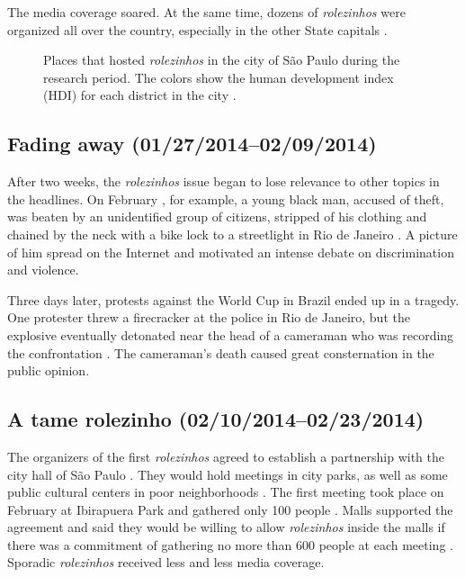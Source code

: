 The media coverage soared. At the same time, dozens of \emph{rolezinhos} were organized all over the country, especially in the other State capitals \autocite{atarde_rolezinho_salvador, opovo_rolezinho_fortaleza, bhaz_rolezinho_estacao, londrina_rolezinho, campogrande_rolezinho}.

\begin{figure}
\centering

\caption{Places that hosted \emph{rolezinhos} in the city of São Paulo during the research period. The colors show the human development index (HDI) for each district in the city \autocite{atlasmunicipal}.}
\label{saopaulodistrict}
\end{figure}

\subsection*{Fading away (01/27/2014--02/09/2014)}

After two weeks, the \emph{rolezinhos} issue began to lose relevance to other topics in the headlines. On February , for example, a young black man, accused of theft, was beaten by an unidentified group of citizens, stripped of his clothing and chained by the neck with a bike lock to a streetlight in Rio de Janeiro \autocite{folha_jovem_acorrentado,g1_jovem_acorrentado}. A picture of him spread on the Internet and motivated an intense debate on discrimination and violence.

Three days later, protests against the World Cup in Brazil ended up in a tragedy. One protester threw a firecracker at the police in Rio de Janeiro, but the explosive eventually detonated near the head of a cameraman who was recording the confrontation \autocite{folha_cinegrafista, g1_cinegrafista}. The cameraman's death caused great consternation in the public opinion.

\subsection*{A tame rolezinho (02/10/2014--02/23/2014)}

The organizers of the first \emph{rolezinhos} agreed to establish a partnership with the city hall of São Paulo \autocite{folha_associacao_prefeitura}. They would hold meetings in city parks, as well as some public cultural centers in poor neighborhoods \autocite{g1_associacao_prefeitura}. The first meeting took place on February  at Ibirapuera Park and gathered only 100 people \autocite{folha_rolezinho_ibirapuera}. Malls supported the agreement and said they would be willing to allow \emph{rolezinhos} inside the malls if there was a commitment of gathering no more than 600 people at each meeting \autocite{g1_mp_shoppings}. Sporadic \emph{rolezinhos} received less and less media coverage.

